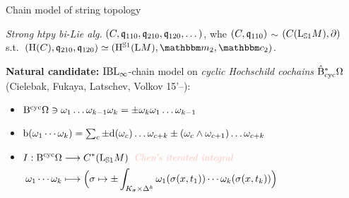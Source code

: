\documentclass[xcolor=dvipsnames]{beamer}
\theoremstyle{plain}
\renewcommand{\emph}[1]{{\itshape\color{pink}#1}}
\newcommand{\emphbf}[1]{{\bfseries\color{YellowGreen}#1}}
\begin{document}
\begin{frame}{Chain model of string topology}

\begin{definition}
\emph{Strong htpy bi-Lie alg.}
$(C,\mathfrak{q}_{110},\mathfrak{q}_{210},\mathfrak{q}_{120},\dotsc)$, whe
$(C,\mathfrak{q}_{110})$ $\sim$ $(C(\mathrm{L}_{\mathbb{S}{1}}M),\partial)$ s.t.~$(\H(C),\OPQ_{210},\OPQ_{120})\simeq (\H^{\Sph{1}}(\Loop M),\StringOp_2,\StringCoOp_2)$.
\end{definition}\pause
\vspace{.3cm}
\emphbf{Natural candidate:} $\mathrm{IBL}_\infty$-chain model on \emph{cyclic Hochschild cochains $\hat{\mathrm{B}}_{\mathrm{cyc}}^* \Omega$} (Cielebak, Fukaya, Latschev, Volkov 15'--):
\begin{itemize}
\item $\mathrm{B}^{\mathrm{cyc}} \Omega \ni \omega_1 \dotsc \omega_{k-1} \omega_k = \pm \omega_k \omega_1 \dotsc \omega_{k-1}$
\item $\mathrm{b}(\omega_1 \dotsb \omega_k) =  \sum_{c}\pm \mathrm{d}(\omega_c) \dotsc \omega_{c+k} \pm (\omega_c\wedge\omega_{c+1})\dotsc \omega_{c+k}$
\item $\begin{aligned}[t] I: 
    \BCyc \DR& \longrightarrow C^*(\StringSpace M)\;\;\text{\emph{Chen's iterated integral}}\\    
    \omega_1 \dotsb \omega_k & \longmapsto  \Bigl(\sigma \mapsto \pm  \int_{K_\sigma \times \Delta^k} \omega_1(\sigma(x,t_1)) \dotsb \omega_k(\sigma(x,t_k))\Bigr)
   \end{aligned}$
\end{itemize}
\end{frame}
\end{document}
